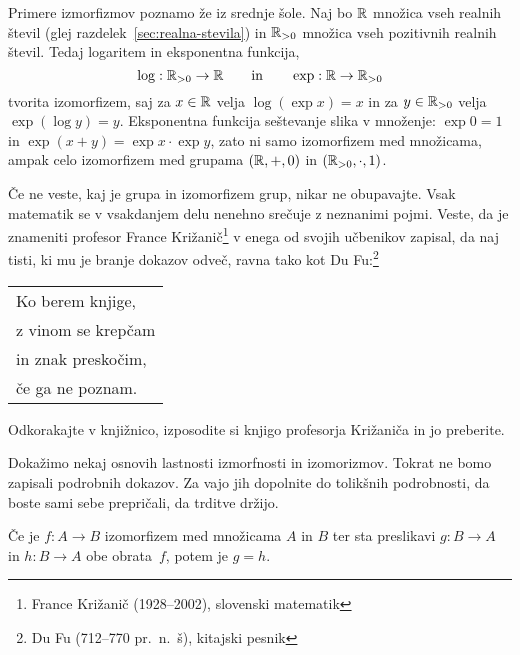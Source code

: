 \begin{zgled}\label{zgled:logaritmiranje-je-obratno-od-eksponenciranja}
  Primere izmorfizmov poznamo že iz srednje šole. Naj bo $\mathbb{R}$ množica vseh realnih števil
  (glej razdelek~\ref{sec:realna-stevila}) in $\mathbb{R}_{>0}$ množica vseh pozitivnih realnih
  števil. Tedaj logaritem in eksponentna funkcija,
  \begin{equation*}
    \log : \mathbb{R}_{>0} \to \mathbb{R}
    \qquad\text{in}\qquad
    \exp : \mathbb{R} \to \mathbb{R}_{>0}
  \end{equation*}
  tvorita izomorfizem, saj za $x \in \mathbb{R}$ velja $\log (\exp x) = x$ in za $y \in \mathbb{R}_{>0}$
  velja $\exp (\log y) = y$. Eksponentna funkcija seštevanje slika v množenje:
  $\exp 0 = 1$ in $\exp (x + y) = \exp x \cdot \exp y$, zato ni samo izomorfizem med
  množicama, ampak celo izomorfizem med grupama $(\mathbb{R}, {+}, 0)$ in
  $(\mathbb{R}_{>0}, {\cdot}, 1)$.

  Če ne veste, kaj je grupa in izomorfizem grup, nikar ne obupavajte. Vsak matematik se v
  vsakdanjem delu nenehno srečuje z neznanimi pojmi. Veste, da je znameniti profesor
  France Križanič\footnote{France Križanič (1928--2002), slovenski matematik} v enega od
  svojih učbenikov zapisal, da naj tisti, ki mu je branje dokazov odveč, ravna tako kot Du
  Fu:\footnote{Du Fu (712--770 pr.~n.~š), kitajski pesnik}
  \begin{center}
    \begin{tabular}{l}
      Ko berem knjige,\\
      z vinom se krepčam\\
      in znak preskočim,\\
      če ga ne poznam.
    \end{tabular}
  \end{center}
\end{zgled}

\begin{vaja}
  Odkorakajte v knjižnico, izposodite si knjigo profesorja Križaniča in jo preberite.
\end{vaja}

Dokažimo nekaj osnovih lastnosti izmorfnosti in izomorizmov. Tokrat ne bomo zapisali
podrobnih dokazov. Za vajo jih dopolnite do tolikšnih podrobnosti, da boste sami sebe
prepričali, da trditve držijo.

\begin{trditev}
  Če je $f : A \to B$ izomorfizem med množicama $A$ in $B$ ter sta preslikavi
  $g : B \to A$ in $h : B \to A$ obe obrata~$f$, potem je $g = h$.
\end{trditev}

